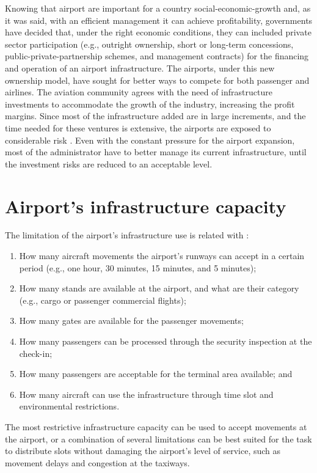 Knowing that airport are important for a country social-economic-growth and, as it was said, with an efficient management it can achieve profitability, governments have decided that, under the right economic conditions, they can included private sector participation (e.g., outright ownership, short or long-term concessions, public-private-partnership schemes, and management contracts) for the financing and operation of an airport infrastructure. The airports, under this new ownership model, have sought for better ways to compete for both passenger and airlines. The aviation community agrees with the need of infrastructure investments to accommodate the growth of the industry, increasing the profit margins. Since most of the infrastructure added are in large increments, and the time needed for these ventures is extensive, the airports are exposed to considerable risk \cite{ICAO2013}. Even with the constant pressure for the airport expansion, most of the administrator have to better manage its current infrastructure, until the investment risks are reduced to an acceptable level.

\section{Airport's infrastructure capacity}
\label{infra}

The limitation of the airport’s infrastructure use is related with \cite{ARC2021, WASG2020}:
\begin{enumerate}
	\item How many aircraft movements the airport’s runways can accept in a certain period (e.g., one hour, 30 minutes, 15 minutes, and 5 minutes);
	\item How many stands are available at the airport, and what are their category (e.g., cargo or passenger commercial flights);
	\item How many gates are available for the passenger movements; 
	\item How many passengers can be processed through the security inspection at the check-in;
	\item How many passengers are acceptable for the terminal area available; and
        \item How many aircraft can use the infrastructure through time slot and environmental restrictions.
\end{enumerate}%

The most restrictive infrastructure capacity can be used to accept movements at the airport, or a combination of several limitations can be best suited for the task to distribute slots without damaging the airport’s level of service, such as movement delays and congestion at the taxiways. 


